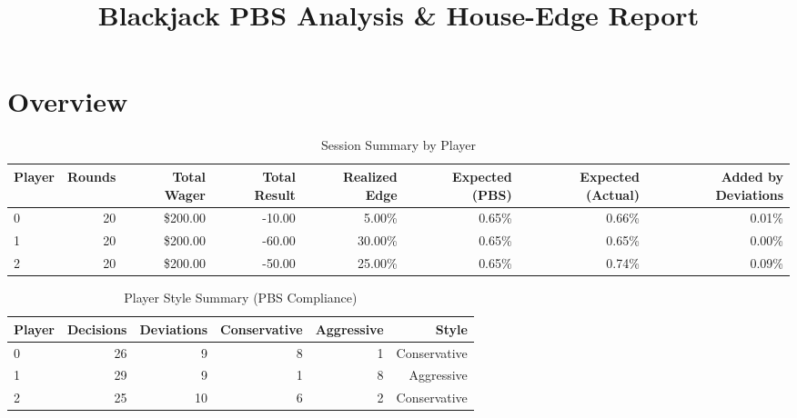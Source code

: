 \documentclass[11pt]{article}
\title{Blackjack PBS Analysis \& House-Edge Report}
\date{}
\begin{document}
\maketitle

\section*{Overview}
\begin{table}[ht]
\centering
\caption{Session Summary by Player}
\label{tab:session\_summary}
\begin{tabular}{l | r | r | r | r | r | r | r}
\hline
Player & Rounds & Total Wager & Total Result & Realized Edge & Expected (PBS) & Expected (Actual) & Added by Deviations \\ \hline
0 & 20 & \$200.00 & -10.00 & 5.00\% & 0.65\% & 0.66\% & 0.01\% \\
1 & 20 & \$200.00 & -60.00 & 30.00\% & 0.65\% & 0.65\% & 0.00\% \\
2 & 20 & \$200.00 & -50.00 & 25.00\% & 0.65\% & 0.74\% & 0.09\% \\
\hline
\end{tabular}
\end{table}
\begin{table}[ht]
\centering
\caption{Player Style Summary (PBS Compliance)}
\label{tab:style\_summary}
\begin{tabular}{l | r | r | r | r | r}
\hline
Player & Decisions & Deviations & Conservative & Aggressive & Style \\ \hline
0 & 26 & 9 & 8 & 1 & Conservative \\
1 & 29 & 9 & 1 & 8 & Aggressive \\
2 & 25 & 10 & 6 & 2 & Conservative \\
\hline
\end{tabular}
\end{table}
\end{document}
